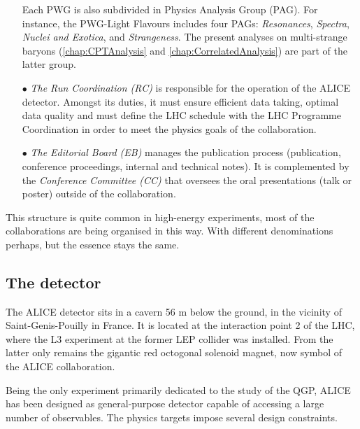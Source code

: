 \begin{itemize}
Each PWG is also subdivided in Physics Analysis Group (PAG). For instance, the PWG-Light Flavours includes four PAGs: \textit{Resonances}, \textit{Spectra}, \textit{Nuclei and Exotica}, and \textit{Strangeness}. The present analyses on multi-strange baryons (\chap\ref{chap:CPTAnalysis} and \ref{chap:CorrelatedAnalysis}) are part of the latter group.

\item[$\bullet$] \textit{The Run Coordination (RC)} is responsible for the operation of the ALICE detector. Amongst its duties, it must ensure efficient data taking, optimal data quality and must define the LHC schedule with the LHC Programme Coordination in order to meet the physics goals of the collaboration.
\item[$\bullet$] \textit{The Editorial Board (EB)} manages the publication process (publication, conference proceedings, internal and technical notes). It is complemented by the \textit{Conference Committee (CC)} that oversees the oral presentations (talk or poster) outside of the collaboration.
\end{itemize}

This structure is quite common in high-energy experiments, most of the collaborations are being organised in this way. With different denominations perhaps, but the essence stays the same.

\subsection{The detector}
\label{subsec:ALICEDetector}

The ALICE detector sits in a cavern 56 m below the ground, in the vicinity of Saint-Genis-Pouilly in France. It is located at the interaction point 2 of the LHC, where the L3 experiment at the former LEP collider was installed. From the latter only remains the gigantic red octogonal solenoid magnet, now symbol of the ALICE collaboration.

Being the only experiment primarily dedicated to the study of the QGP, ALICE has been designed as general-purpose detector capable of accessing a large number of observables. The physics targets impose several design constraints.

